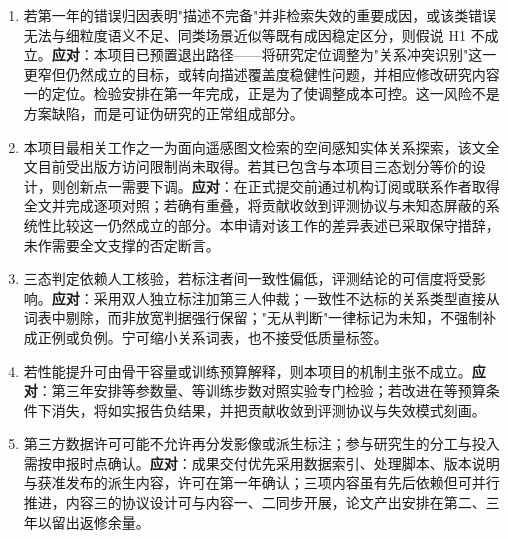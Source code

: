 \begin{enumerate}
    \item {}若第一年的错误归因表明"描述不完备"并非检索失效的重要成因，或该类错误无法与细粒度语义不足、同类场景近似等既有成因稳定区分，则假说 H1 不成立。\textbf{应对}：本项目已预置退出路径——将研究定位调整为"关系冲突识别"这一更窄但仍然成立的目标，或转向描述覆盖度稳健性问题，并相应修改研究内容一的定位。检验安排在第一年完成，正是为了使调整成本可控。这一风险不是方案缺陷，而是可证伪研究的正常组成部分。

    \item {}本项目最相关工作之一为面向遥感图文检索的空间感知实体关系探索\cite{shui2025esrn}，该文全文目前受出版方访问限制尚未取得。若其已包含与本项目三态划分等价的设计，则创新点一需要下调。\textbf{应对}：在正式提交前通过机构订阅或联系作者取得全文并完成逐项对照；若确有重叠，将贡献收敛到评测协议与未知态屏蔽的系统性比较这一仍然成立的部分。本申请对该工作的差异表述已采取保守措辞，未作需要全文支撑的否定断言。

    \item {}三态判定依赖人工核验，若标注者间一致性偏低，评测结论的可信度将受影响。\textbf{应对}：采用双人独立标注加第三人仲裁；一致性不达标的关系类型直接从词表中剔除，而非放宽判据强行保留；"无从判断"一律标记为未知，不强制补成正例或负例。宁可缩小关系词表，也不接受低质量标签。

    \item {}若性能提升可由骨干容量或训练预算解释，则本项目的机制主张不成立。\textbf{应对}：第三年安排等参数量、等训练步数对照实验专门检验；若改进在等预算条件下消失，将如实报告负结果，并把贡献收敛到评测协议与失效模式刻画。

    \item {}第三方数据许可可能不允许再分发影像或派生标注；参与研究生的分工与投入需按申报时点确认。\textbf{应对}：成果交付优先采用数据索引、处理脚本、版本说明与获准发布的派生内容，许可在第一年确认；三项内容虽有先后依赖但可并行推进，内容三的协议设计可与内容一、二同步开展，论文产出安排在第二、三年以留出返修余量。
\end{enumerate}

